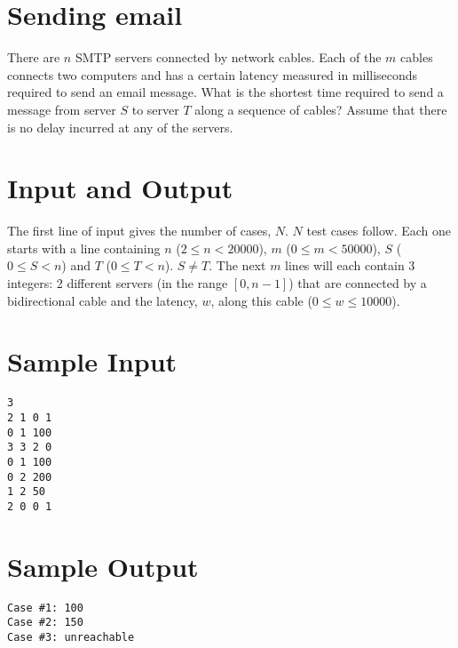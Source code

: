 \documentclass{article}
\begin{document}
\section*{\fontsize{12}{25}Sending email}
There are $n$ SMTP servers connected by network cables. Each of the $m$ cables connects two computers and has a certain latency measured in milliseconds required to send an email message. What is the shortest time required to send a message from server $S$ to server $T$ along a sequence of cables? Assume that there is no delay incurred at any of the servers.

\section*{Input and Output}
The first line of input gives the number of cases, $N$. $N$ test cases follow. Each one starts with a line containing $n$ ($2 \leq n < 20000$), $m$ ($0 \leq m < 50000$), $S$ ($0 \leq S < n$) and $T$ ($0 \leq T < n$). $S \neq T$. The next $m$ lines will each contain 3 integers: 2 different servers (in the range $[0, n-1]$) that are connected by a bidirectional cable and the latency, $w$, along this cable ($0 \leq w \leq 10000$).

\section*{Sample Input}
\begin{verbatim}
3
2 1 0 1
0 1 100
3 3 2 0
0 1 100
0 2 200
1 2 50
2 0 0 1
\end{verbatim}

\section*{Sample Output}
\begin{verbatim}
Case #1: 100
Case #2: 150
Case #3: unreachable

\end{verbatim}
\end{document}
